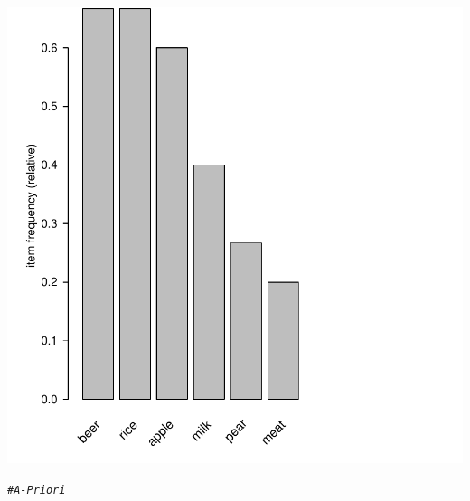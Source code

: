 \documentclass{article}\usepackage[]{graphicx}\usepackage[]{xcolor}
\makeatletter
\newcommand{\hlcom}[1]{\textcolor[rgb]{0.678,0.584,0.686}{\textit{#1}}}%
\newenvironment{kframe}{%
 \def\at@end@of@kframe{}%
 \ifinner\ifhmode%
  \def\at@end@of@kframe{\end{minipage}}%
  \begin{minipage}{\columnwidth}%
 \fi\fi%
 \def\FrameCommand##1{\hskip\@totalleftmargin \hskip-\fboxsep
 \colorbox{shadecolor}{##1}\hskip-\fboxsep
     \hskip-\linewidth \hskip-\@totalleftmargin \hskip\columnwidth}%
 \MakeFramed {\advance\hsize-\width
   \@totalleftmargin\z@ \linewidth\hsize
   \@setminipage}}%
 {\par\unskip\endMakeFramed%
 \at@end@of@kframe}
\newenvironment{knitrout}{}{} %
\makeatother
\begin{document}
\begin{knitrout}
{\centering \includegraphics[width=.6\linewidth]{figure/ARULES1-SOLUCION-Rnwauto-report-2} 

}


\begin{kframe}\begin{alltt}
\hlcom{# A-Priori}


\end{alltt}
\end{kframe}
\end{knitrout}
\end{document}
